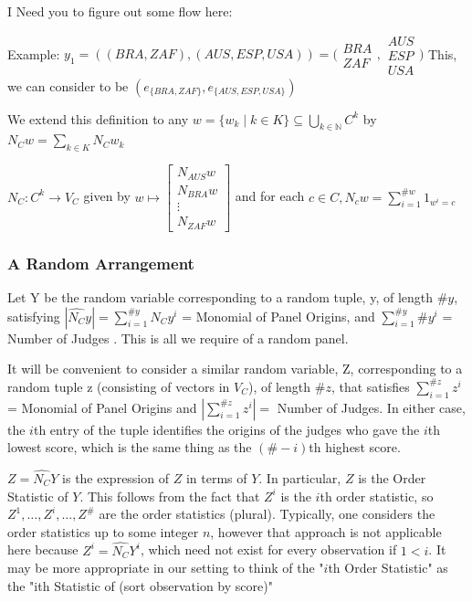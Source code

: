 \documentclass{article}
\begin{document}
I Need you to figure out some flow here:

Example:
\( y_1 = (( BRA, ZAF) ,(AUS, ESP, USA)) = \bigg( \begin{matrix} BRA \\ ZAF \end{matrix}, \begin{matrix} AUS \\ ESP \\ USA \end{matrix}\bigg) \)  
This, we can consider to be $(e_{\{BRA,ZAF\}},e_{\{AUS,ESP,USA\}})$

We extend this definition to any $w =\{w_k \mid k \in K\} \subseteq \bigcup_{k\in\mathbb{N}} C^k $ by $N_C w = \sum_{k\in K} N_C w_k$

$N_C: C^k \rightarrow V_C $ given by $ w \mapsto \begin{bmatrix} N_{AUS}w \\ N_{BRA}w \\ \vdots \\ N_{ZAF}w \end{bmatrix} $ and for each $ c \in C, N_cw = \sum_{i=1}^{\#w} 1_{w^i = c} $

\subsubsection{A Random Arrangement}
Let Y be the random variable corresponding to a random tuple, y, of length $\#y$, satisfying $ |\hat{N_C}y|=\sum_{i=1}^{\#y} N_C y^i$ = Monomial of Panel Origins, and $\sum_{i=1}^{\#y} \#y^i $ = Number of Judges . This is all we require of a random panel. 

It will be convenient to consider a similar random variable, Z, corresponding to a random tuple z (consisting of vectors in $V_C$), of length $\#z$, that satisfies $\sum_{i=1}^{\#z} z^i$ = Monomial of Panel Origins and $|\sum_{i=1}^{\#z} z^i | = $ Number of Judges. In either case, the $i$th entry of the tuple identifies the origins of the judges who gave the  $i$th lowest score, which is the same thing as the $(\#-i)$th highest score. 

$Z = \hat{N_C}Y$ is the expression of $Z$ in terms of $Y$. In particular, $Z$ is the Order Statistic of $Y$. This follows from the fact that $Z^i$ is the $i$th order statistic, so $Z^1,\dots,Z^i,\dots,Z^{\#}$ are the order statistics (plural). Typically, one considers the order statistics up to some integer $n$, however that approach is not applicable here because $Z^i = \hat{N_C}Y^i$, which need not exist for every observation if $1<i$. It may be more appropriate in our setting to think of the "$i$th Order Statistic" as the "ith Statistic of (sort observation by score)"
\end{document}
